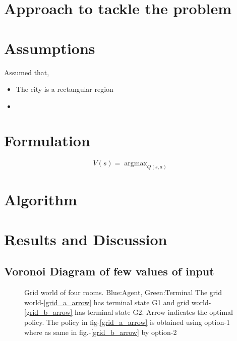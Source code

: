 \documentclass[preprint,12pt]{elsarticle}
\DeclareMathOperator*{\argmax}{argmax}
\begin{document}
\section{Approach to tackle the problem}

\section{Assumptions}
Assumed that,
\begin{itemize}
	\item The city is a rectangular region
	\item
\end{itemize}


\section{Formulation}
\begin{equation}
V(s) = \argmax_{Q(s,a)} 
\end{equation}

\section{Algorithm}
\section{Results and Discussion}
\subsection{Voronoi Diagram of few values of input}

\begin{figure}[H]
	\centering  
	\caption{Grid world of four rooms.  Blue:Agent, Green:Terminal The grid world-\ref{grid_a_arrow} has terminal state G1 and grid world-\ref{grid_b_arrow} has terminal state G2. Arrow indicates the optimal policy. The policy in fig-\ref{grid_a_arrow} is obtained using option-1 where as same in fig.-\ref{grid_b_arrow} by option-2 }
	\label{fig:grids}
\end{figure}
\end{document}
